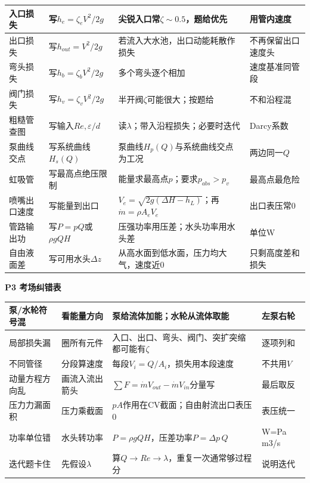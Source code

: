 \documentclass[UTF8,a4paper]{ctexart}
\newcommand{\ftitle}[1]{\vspace{1pt}\textbf{\textcolor{B}{#1}}\par\vspace{0.5pt}}
\begin{document}
\begin{tabular}{|L{0.19\textwidth}|L{0.23\textwidth}|L{0.34\textwidth}|L{0.19\textwidth}|}\hline
入口损失 & 写$h_e=\zeta_eV^2/2g$ & 尖锐入口常$\zeta\sim0.5$，题给优先 & 用管内速度 \\\hline
出口损失 & 写$h_{out}=V^2/2g$ & 若流入大水池，出口动能耗散作损失 & 不再保留出口速度头 \\\hline
弯头损失 & 写$h_b=\zeta_bV^2/2g$ & 多个弯头逐个相加 & 速度基准同管段 \\\hline
阀门损失 & 写$h_v=\zeta_vV^2/2g$ & 半开阀$\zeta$可能很大；按题给 & 不和沿程混 \\\hline
粗糙管查图 & 写输入$Re,\varepsilon/d$ & 读$\lambda$；带入沿程损失；必要时迭代 & Darcy系数 \\\hline
泵曲线交点 & 写系统曲线$H_s(Q)$ & 泵曲线$H_p(Q)$与系统曲线交点为工况 & 两边同一$Q$ \\\hline
虹吸管 & 写最高点绝压限制 & 能量求最高点$p$；要求$p_{abs}>p_v$ & 最高点最危险 \\\hline
喷嘴出口速度 & 写能量到出口 & $V_e=\sqrt{2g(\Delta H-h_L)}$；再$\dot m=\rho A_eV_e$ & 出口表压常0 \\\hline
管路输出功 & 写$P=pQ$或$\rho gQH$ & 压强功率用压差；水头功率用水头差 & 单位W \\\hline
自由液面差 & 写可用水头$\Delta z$ & 从高水面到低水面，压力均大气，速度近0 & 只剩高度差和损失 \\\hline
\end{tabular}
\ftitle{P3 考场纠错表}
\begin{tabular}{|L{0.22\textwidth}|L{0.25\textwidth}|L{0.33\textwidth}|L{0.15\textwidth}|}\hline
泵/水轮符号混 & 看能量方向 & 泵给流体加能；水轮从流体取能 & 左泵右轮 \\\hline
局部损失漏 & 圈所有元件 & 入口、出口、弯头、阀门、突扩突缩都可能有$\zeta$ & 逐项列和 \\\hline
不同管径 & 分段算速度 & 每段$V_i=Q/A_i$，损失用本段速度 & 不共用$V$ \\\hline
动量方程方向乱 & 画流入流出箭头 & $\sum F=\dot m V_{out}-\dot m V_{in}$分量写 & 最后取反 \\\hline
压力力漏面积 & 压力乘截面 & $pA$作用在CV截面；自由射流出口表压0 & 表压统一 \\\hline
功率单位错 & 水头转功率 & $P=\rho gQH$，压差功率$P=\Delta p\,Q$ & W=Pa m3/s \\\hline
迭代题卡住 & 先假设$\lambda$ & 算$Q\to Re\to\lambda$，重复一次通常够过程分 & 说明迭代 \\\hline
\end{tabular}
\end{document}
